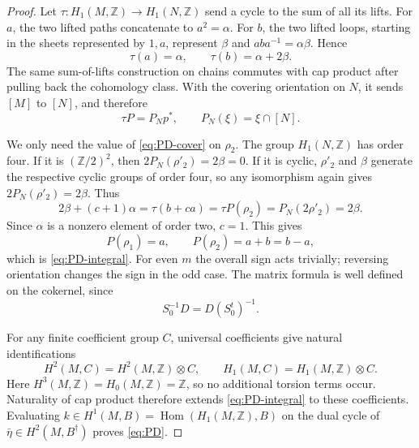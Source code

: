 \documentclass[11pt,a4paper,reqno]{amsart}
\theoremstyle{plain}
\theoremstyle{definition}
\theoremstyle{remark}
\numberwithin{equation}{section}
\DeclareMathOperator{\Hom}{Hom}
\newcommand{\ZZ}{\mathbb Z}
\begin{document}
\begin{proof}
Let $\tau\colon H_1(M,\ZZ)\to H_1(N,\ZZ)$ send a cycle to the sum of all its lifts. For $a$, the two lifted paths concatenate to $a^2=\alpha$. For $b$, the two lifted loops, starting in the sheets represented by $1,a$, represent $\beta$ and $aba^{-1}=\alpha\beta$. Hence
\[
\tau(a)=\alpha,\qquad \tau(b)=\alpha+2\beta.
\]
The same sum-of-lifts construction on chains commutes with cap product after pulling back the cohomology class. With the covering orientation on $N$, it sends $[M]$ to $[N]$, and therefore
\begin{equation}\label{eq:PD-cover}
\tau P=P_Np^*,\qquad P_N(\xi)=\xi\cap[N].
\end{equation}

We only need the value of \eqref{eq:PD-cover} on $\rho_2$. The group $H_1(N,\ZZ)$ has order four. If it is $(\ZZ/2)^2$, then $2P_N(\rho'_2)=2\beta=0$. If it is cyclic, $\rho'_2$ and $\beta$ generate the respective cyclic groups of order four, so any isomorphism again gives $2P_N(\rho'_2)=2\beta$. Thus
\[
2\beta+(c+1)\alpha
=\tau(b+ca)
=\tau P(\rho_2)
=P_N(2\rho'_2)
=2\beta.
\]
Since $\alpha$ is a nonzero element of order two, $c=1$. This gives
\[
P(\rho_1)=a,\qquad P(\rho_2)=a+b=b-a,
\]
which is \eqref{eq:PD-integral}. For even $m$ the overall sign acts trivially; reversing orientation changes the sign in the odd case. The matrix formula is well defined on the cokernel, since
\[
S_0^{-1}D=D(S_0^t)^{-1}.
\]

For any finite coefficient group $C$, universal coefficients give natural identifications
\[
H^2(M,C)=H^2(M,\ZZ)\otimes C,
\qquad
H_1(M,C)=H_1(M,\ZZ)\otimes C.
\]
Here $H^3(M,\ZZ)=H_0(M,\ZZ)=\ZZ$, so no additional torsion terms occur. Naturality of cap product therefore extends \eqref{eq:PD-integral} to these coefficients. Evaluating $k\in H^1(M,B)=\Hom(H_1(M,\ZZ),B)$ on the dual cycle of $\bar\eta\in H^2(M,B^\dagger)$ proves \eqref{eq:PD}.
\end{proof}
\end{document}
